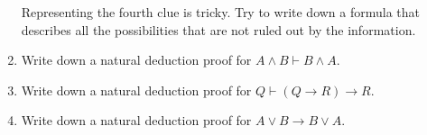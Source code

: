 \documentclass[12pt]{amsart}
\theoremstyle{definition}
\begin{document}
\begin{enumerate}
Representing the fourth clue is tricky. Try to write down a formula that
describes all the possibilities that are not ruled out by the information.

\item Write down a natural deduction proof for $A \land B \vdash B \land A$. 

\item Write down a natural deduction proof for $Q \vdash (Q \to R) \to R$.

\item Write down a natural deduction proof for $A \lor B \to B \lor A$.

\end{enumerate}
\end{document}
